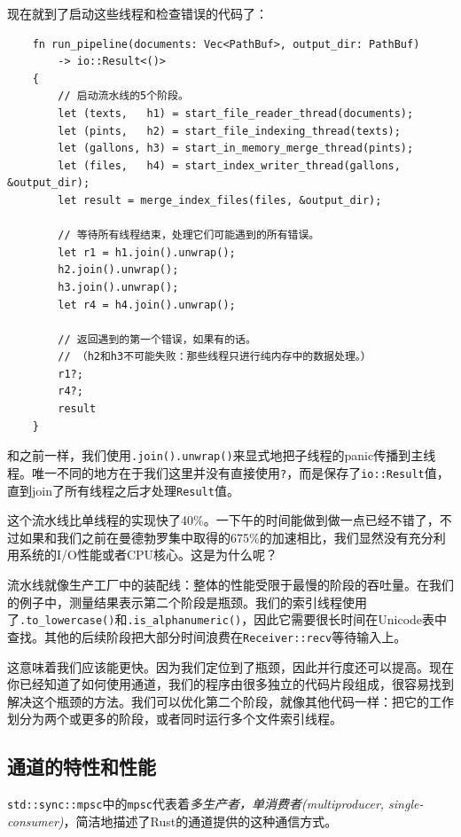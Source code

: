 现在就到了启动这些线程和检查错误的代码了：
\begin{verbatim}
    fn run_pipeline(documents: Vec<PathBuf>, output_dir: PathBuf)
        -> io::Result<()>
    {
        // 启动流水线的5个阶段。
        let (texts,   h1) = start_file_reader_thread(documents);
        let (pints,   h2) = start_file_indexing_thread(texts);
        let (gallons, h3) = start_in_memory_merge_thread(pints);
        let (files,   h4) = start_index_writer_thread(gallons, &output_dir);
        let result = merge_index_files(files, &output_dir);

        // 等待所有线程结束，处理它们可能遇到的所有错误。
        let r1 = h1.join().unwrap();
        h2.join().unwrap();
        h3.join().unwrap();
        let r4 = h4.join().unwrap();

        // 返回遇到的第一个错误，如果有的话。
        // （h2和h3不可能失败：那些线程只进行纯内存中的数据处理。）
        r1?;
        r4?;
        result
    }
\end{verbatim}

和之前一样，我们使用\texttt{.join().unwrap()}来显式地把子线程的panic传播到主线程。唯一不同的地方在于我们这里并没有直接使用\texttt{?}，而是保存了\texttt{io::Result}值，直到join了所有线程之后才处理\texttt{Result}值。

这个流水线比单线程的实现快了40\%。一下午的时间能做到做一点已经不错了，不过如果和我们之前在曼德勃罗集中取得的675\%的加速相比，我们显然没有充分利用系统的I/O性能或者CPU核心。这是为什么呢？

流水线就像生产工厂中的装配线：整体的性能受限于最慢的阶段的吞吐量。在我们的例子中，测量结果表示第二个阶段是瓶颈。我们的索引线程使用了\texttt{.to\_lowercase()}和\texttt{.is\_alphanumeric()}，因此它需要很长时间在Unicode表中查找。其他的后续阶段把大部分时间浪费在\texttt{Receiver::recv}等待输入上。

这意味着我们应该能更快。因为我们定位到了瓶颈，因此并行度还可以提高。现在你已经知道了如何使用通道，我们的程序由很多独立的代码片段组成，很容易找到解决这个瓶颈的方法。我们可以优化第二个阶段，就像其他代码一样：把它的工作划分为两个或更多的阶段，或者同时运行多个文件索引线程。

\subsection{通道的特性和性能}
\texttt{std::sync::mpsc}中的\texttt{mpsc}代表着\emph{多生产者，单消费者(multiproducer, single-consumer)}，简洁地描述了Rust的通道提供的这种通信方式。

